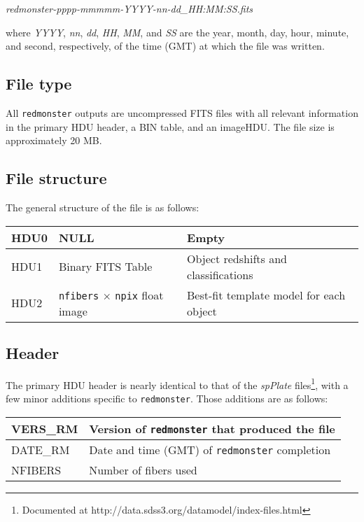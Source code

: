 \documentclass[12pt]{article}
\begin{document}
\begin{center}
	\textit{redmonster-pppp-mmmmm-YYYY-nn-dd\_HH:MM:SS.fits}
\end{center}

where \textit{YYYY}, \textit{nn}, \textit{dd}, \textit{HH}, \textit{MM}, and \textit{SS}
are the year, month, day, hour, minute, and second, respectively, of the time (GMT) at which
the file was written.

\subsection{File type}

All \texttt{redmonster} outputs are uncompressed FITS files with all relevant information
in the primary HDU header, a BIN table, and an imageHDU.  The file size is approximately 20 MB.

\subsection{File structure}

The general structure of the file is as follows:

\begin{center}
	\begin{tabular}{ | l | l | l |}
	\hline
	HDU0 & NULL & Empty \\ \hline
	HDU1 & Binary FITS Table & Object redshifts and classifications \\ \hline
	HDU2 & \texttt{nfibers} $\times$ \texttt{npix} float image & Best-fit template model for each object \\
	\hline
	\end{tabular}
\end{center}

\subsection{Header}

The primary HDU header is nearly identical to that of the \textit{spPlate}
files\footnote{Documented at http://data.sdss3.org/datamodel/index-files.html}, with a few minor
additions specific to \texttt{redmonster}.  Those additions are as follows:

\begin{center}
	\begin{tabular}{ | l | l | }
	\hline
	VERS\_RM & Version of \texttt{redmonster} that produced the file \\ \hline
	DATE\_RM & Date and time (GMT) of \texttt{redmonster} completion \\ \hline
	NFIBERS & Number of fibers used \\
	\hline
	\end{tabular}
\end{center}
\end{document}
